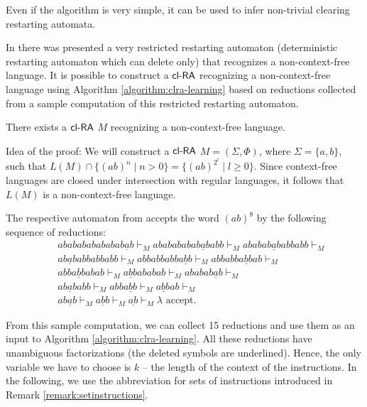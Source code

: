Even if the algorithm is very simple, it can be used to infer non-trivial clearing restarting automata.

In \cite{JMPV97} there was presented a very restricted restarting automaton (deterministic restarting automaton which can delete only) that recognizes a non-context-free language. It is possible to construct a $\mbox{\sf cl-RA\/}$ recognizing a non-context-free language using Algorithm \ref{algorithm:clra-learning} based on reductions collected from a sample computation of this restricted restarting automaton.

\begin{theorem}\label{theorem:clRAnonCFL}
There exists a $\mbox{\sf cl-RA\/}$ $M$ recognizing a non-context-free language.
\end{theorem}

Idea of the proof: We will construct a $\mbox{\sf cl-RA\/}$ $M = (\Sigma, \Phi)$, where $\Sigma = \{a, b\}$, such that $L(M) \cap \{(ab)^n \mid n>0\} = \{(ab)^{2^l} \mid l \ge 0\}$. Since context-free languages are closed under intersection with regular languages, it follows that $L(M)$ is a non-context-free language.

The respective automaton from \cite{JMPV97} accepts the word $(ab)^8$ by the following sequence of reductions:
\begin{eqnarray*}
& & ababababababab\underline{a}b  \vdash_M
ababababab\underline{a}babb  \vdash_M
  ababab\underline{a}babbabb  \vdash_M\\
& & ab\underline{a}babbabbabb  \vdash_M
  abbabbabba\underline{b}b  \vdash_M
  abbabba\underline{b}bab  \vdash_M\\
& & abba\underline{b}babab  \vdash_M
  a\underline{b}bababab  \vdash_M
  ababab\underline{a}b  \vdash_M\\
& & ab\underline{a}babb  \vdash_M
  abba\underline{b}b  \vdash_M
  a\underline{b}bab  \vdash_M\\
& & ab\underline{a}b  \vdash_M
  a\underline{b}b  \vdash_M
  \underline{ab}  \vdash_M
  \lambda  \mbox{ accept}.
\end{eqnarray*}

From this sample computation, we can collect 15 reductions and use them as an input to Algorithm \ref{algorithm:clra-learning}. All these reductions have unambiguous factorizations (the deleted symbols are underlined). Hence, the only variable we have to choose is $k$ -- the length of the context of the instructions. In the following, we use the abbreviation for sets of instructions introduced in Remark \ref{remark:setinstructions}.

